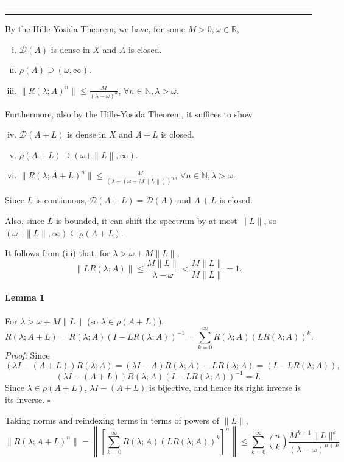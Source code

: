 \documentclass[11pt]{article}
\newcounter{questionCounter}
\newcounter{partCounter}[questionCounter]
\newenvironment{question}[2][\arabic{questionCounter}]{%
    \setcounter{partCounter}{0}%
    \vspace{.25in} \hrule \vspace{0.5em}%
        \noindent{\bf #2}%
    \vspace{0.8em} \hrule \vspace{.10in}%
    \addtocounter{questionCounter}{1}%
}{}
\newcommand{\inv}{^{-1}}
\newcommand{\N}{\mathbb{N}}             %
\newcommand{\R}{\mathbb{R}}             %
\newcommand{\D}{\mathcal{D}}            %
\begin{document}
\begin{question}{Problem 6}
By the Hille-Yosida Theorem, we have, for some $M > 0,\omega \in \R$,
\begin{enumerate}[(i)]
\item $\D(A)$ is dense in $X$ and $A$ is closed.
\item $\rho(A) \supseteq (\omega,\infty)$.
\item $\displaystyle \|R(\lambda;A)^n\| \leq \frac{M}{(\lambda - \omega)^n}$,
$\forall n \in \N, \lambda > \omega$.
\end{enumerate}
Furthermore, also by the Hille-Yosida Theorem, it suffices to show
\begin{enumerate}[(i)]
\setcounter{enumi}{3}
\item $\D(A + L)$ is dense in $X$ and $A + L$ is closed.
\item $\rho(A + L) \supseteq (\omega + \|L\|,\infty)$.
\item $\displaystyle \|R(\lambda;A + L)^n\|
            \leq \frac{M}{(\lambda - (\omega + M\|L\|))^n}$,
$\forall n \in \N, \lambda > \omega$.
\end{enumerate}

Since $L$ is continuous, $\D(A + L) = \D(A)$ and $A + L$ is closed.

Also, since $L$ is bounded, it can shift the spectrum by at most $\|L\|$, so
$(\omega + \|L\|,\infty) \subseteq \rho(A + L)$.

It follows from (iii) that, for $\lambda > \omega + M\|L\|$,
\[\|LR(\lambda;A)\|
    \leq \frac{M\|L\|}{\lambda - \omega}
    < \frac{M\|L\|}{M\|L\|}
    = 1.
\]
\paragraph{Lemma 1} For $\lambda > \omega + M\|L\|$ (so
$\lambda \in \rho(A + L)$),
\[R(\lambda; A + L)
    = R(\lambda; A) \left( I - LR(\lambda; A) \right)\inv
    = \sum_{k = 0}^\infty R(\lambda; A) \left( LR(\lambda; A) \right)^k.
\]
\emph{Proof:} Since
\[
\left( \lambda I - (A + L) \right) R(\lambda;A)
    = (\lambda I - A)R(\lambda;A) - LR(\lambda; A)
    = \left( I - LR(\lambda; A) \right),
\]
\[\left( \lambda I - (A + L) \right) R(\lambda;A)
                                        \left( I - LR(\lambda; A)\right) \inv
    = I.
\]
Since $\lambda \in \rho(A + L)$, $\lambda I - (A + L)$ is bijective, and hence
its right inverse is its inverse. $\square$

Taking norms and reindexing terms in terms of powers of $\|L\|$,
\[\|R(\lambda; A + L)^n\|
    = \left\|\left[ \sum_{k = 0}^\infty R(\lambda; A) \left( LR(\lambda; A) \right)^k \right]^n
\right\|
    \leq \sum_{k = 0}^\infty \binom{n}{k} \frac{M^{k + 1}\|L\|^k}
                                                {(\lambda - \omega)^{n + k}}
\]


\end{question}
\end{document}
